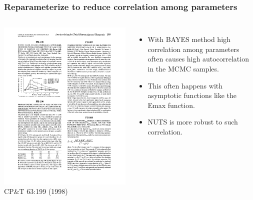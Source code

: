 \documentclass[handout]{beamer}
\begin{document}
\begin{frame}
  \frametitle{\large Reparameterize to reduce correlation among parameters}
  
  \begin{columns}
    \includegraphics[width=\textwidth]{graphics/BachmanGillespie_tuncatedEmaxAbstract_CPT1998.pdf}\\
    CP\&T 63:199 (1998)
    \begin{itemize}
\item With BAYES method high correlation among parameters often causes
  high autocorrelation in the MCMC samples.
\item This often happens with asymptotic functions like the Emax
  function. 
\item NUTS is more robust to such correlation.
    \end{itemize}
  \end{columns}

\end{frame}
\end{document}
